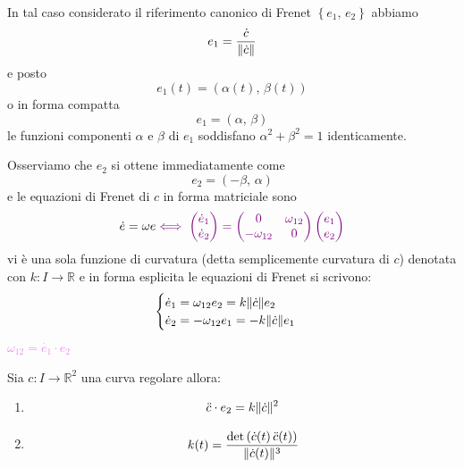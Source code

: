         In tal caso considerato il riferimento canonico di Frenet $\left\{e_1, \, e_2\right\}$ abbiamo 
        \[ e_1 = \frac{\dot{c}}{\lVert\dot{c}\rVert} \]
        e posto 
        \[ e_1(t)=\left( \alpha(t), \, \beta(t) \right) \]
        o in forma compatta 
        \[ e_1 = (\alpha, \, \beta) \]
        le funzioni componenti $\alpha$ e $\beta$ di $e_1$ soddisfano $\alpha^2 + \beta^2 = 1$ identicamente.

        Osserviamo che $e_2$ si ottene immediatamente come 
        \begin{equation}
        \label{eq:secondo_vettore_del_riferimento_canonico_di_Frenet_in_una_curva_piana}
        e_2 = (-\beta, \, \alpha)
        \end{equation}
        e le equazioni di Frenet di $c$ in forma matriciale sono 
        \[ \dot{e} = \omega e \textcolor{violet}{\iff 
        \begin{pmatrix}
        \dot{e}_1 \\
        \dot{e}_2
        \end{pmatrix}
        =
        \begin{pmatrix}
        0 & \omega_{12} \\
        -\omega_{12} & 0
        \end{pmatrix}
        \begin{pmatrix}
        e_1 \\
        e_2
        \end{pmatrix}} \]
        vi è una sola funzione di curvatura (detta semplicemente curvatura di $c$) denotata con $k \colon I \to \mathbb{R}$ e in forma 
        esplicita le equazioni di Frenet si scrivono:
        \begin{equation}
        \label{eq:Frenet_per_curve_piane}
        \begin{cases}
            \dot{e}_1 = \omega_{12} e_2 = k \lVert\dot{c}\rVert e_2 \\
            \dot{e}_2 = -\omega_{12} e_1 = - k \lVert\dot{c}\rVert e_1
        \end{cases}
        \end{equation}
        \textcolor{violet}{$\omega_{12} = \dot{e_1} \cdot e_2$}
        \newpage
        \begin{proposizione}
        Sia $c \colon I \to \mathbb{R}^2$ una curva regolare allora:
        \begin{enumerate}
            \item 
            \begin{equation}
            \label{eq:relazione_tra_la_derivata_seconda_di_c_e_la_funzione_di_curvatura_di_una_curva_piana}
            \ddot{c} \cdot e_2 = k \lVert\dot{c}\rVert^2
            \end{equation}
            \item 
            \begin{equation} 
            \label{eq:funzione_di_curvatura_curva_piana}  
            k(t) = \frac{\det \left( \dot{c}(t) \, \ddot{c}(t) \right)}{ \lVert\dot{c}(t)\rVert^3} \end{equation}
        \end{enumerate}
        \end{proposizione}
